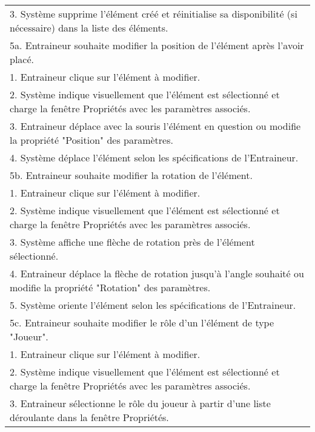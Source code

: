 \begin{longtable}{|p{16cm}|}
	\hspace{0.5cm}3. Système supprime l'élément créé et réinitialise sa disponibilité (si nécessaire) dans la liste des éléments.\\
	5a. Entraineur souhaite modifier la position de l'élément après l'avoir placé.\\
	\hspace{0.5cm}1. Entraineur clique sur l'élément à modifier.\\
	\hspace{0.5cm}2. Système indique visuellement que l'élément est sélectionné et charge la fenêtre Propriétés avec les paramètres associés.\\
	\hspace{0.5cm}3. Entraineur déplace avec la souris l'élément en question ou modifie la propriété "Position" des paramètres.\\
	\hspace{0.5cm}4. Système déplace l'élément selon les spécifications de l'Entraineur.\\
	5b. Entraineur souhaite modifier la rotation de l'élément.\\
	\hspace{0.5cm}1. Entraineur clique sur l'élément à modifier.\\
	\hspace{0.5cm}2. Système indique visuellement que l'élément est sélectionné et charge la fenêtre Propriétés avec les paramètres associés.\\
	\hspace{0.5cm}3. Système affiche une flèche de rotation près de l'élément sélectionné.\\
	\hspace{0.5cm}4. Entraineur déplace la flèche de rotation jusqu'à l'angle souhaité ou modifie la propriété "Rotation" des paramètres.\\
	\hspace{0.5cm}5. Système oriente l'élément selon les spécifications de l'Entraineur.\\
	5c. Entraineur souhaite modifier le rôle d'un l'élément de type "Joueur".\\
	\hspace{0.5cm}1. Entraineur clique sur l'élément à modifier.\\
	\hspace{0.5cm}2. Système indique visuellement que l'élément est sélectionné et charge la fenêtre Propriétés avec les paramètres associés.\\
	\hspace{0.5cm}3. Entraineur sélectionne le rôle du joueur à partir d'une liste déroulante dans la fenêtre Propriétés.\\

\end{longtable}

